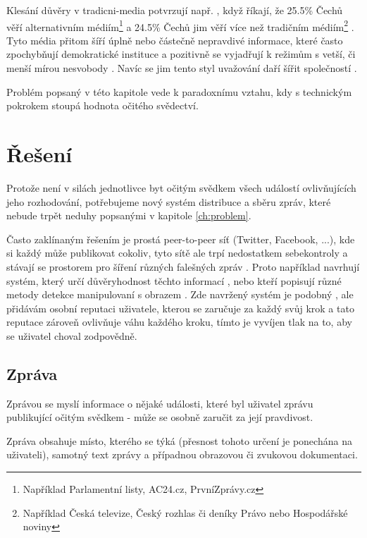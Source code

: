 \documentclass[12pt,a4paper]{report}
\begin{document}
Klesání důvěry v \gls{tradicni-media} potvrzují např. \citeauthor{janda16b}, když říkají, že 25.5\% Čechů věří alternativním médiím\footnote{Například Parlamentní listy, AC24.cz, PrvníZprávy.cz} a 24.5\% Čechů jim věří více než tradičním médiím\footnote{Například Česká televize, Český rozhlas či deníky Právo nebo Hospodářské noviny} \citep{janda16b}. Tyto média přitom šíří úplně nebo částečně nepravdivé informace, které často zpochybňují demokratické instituce a pozitivně se vyjadřují k režimům s vetší, či menší mírou nesvobody \citep{janda16a}. Navíc se jim tento styl uvažování daří šířit společností \citep{janda16b}.

Problém popsaný v této kapitole vede k paradoxnímu vztahu, kdy s technickým pokrokem stoupá hodnota očitého svědectví.

\chapter{Řešení}
\label{ch:reseni}

Protože není v silách jednotlivce byt očitým svědkem všech událostí ovlivňujících jeho rozhodování, potřebujeme nový systém distribuce a sběru zpráv, které nebude trpět neduhy popsanými v kapitole \ref{ch:problem}.

Často zaklínaným řešením je prostá \gls{peer-to-peer} síť (Twitter, Facebook, ...), kde si každý může publikovat cokoliv, tyto sítě ale trpí nedostatkem sebekontroly a stávají se prostorem pro šíření různých falešných zpráv \citep{netanel01}. Proto například \citeauthor{giasemidis16} navrhují systém, který určí důvěryhodnost těchto informací \citep{giasemidis16}, nebo \citeauthor{mishra13} kteří popisují různé metody detekce manipulovaní s obrazem \citep{mishra13}. Zde navržený systém je podobný \citeauthor{dragoni13}, ale přidávám osobní reputaci uživatele, kterou se zaručuje za každý svůj krok a tato reputace zároveň ovlivňuje váhu každého kroku, tímto je vyvíjen tlak na to, aby se uživatel choval zodpovědně.

\section{Zpráva}
\label{sec:zprava}

Zprávou se myslí informace o nějaké události, které byl uživatel zprávu publikující očitým svědkem - může se osobně zaručit za její pravdivost.

Zpráva obsahuje místo, kterého se týká (přesnost tohoto určení je ponechána na uživateli), samotný text zprávy a případnou obrazovou či zvukovou dokumentaci.
\end{document}
